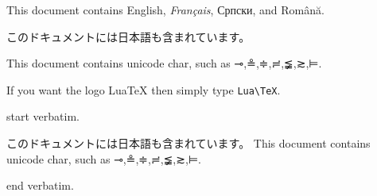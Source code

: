\documentclass[a4paper]{article}
\begin{document}
This document contains English, \textit{Français}, Српски,
and Rom\^an\u{a}.

このドキュメントには日本語も含まれています。

This document contains unicode char, such as ⊸,≗,≑,≓,≨,≳,⊨.

{\sffamily
If you want the logo {Lua\TeX} then simply type \verb|Lua\TeX|.}

\begin{verbatim*}
start verbatim.

このドキュメントには日本語も含まれています。
This document contains unicode char, such as ⊸,≗,≑,≓,≨,≳,⊨.

end verbatim.
\end{verbatim*}
\end{document}
